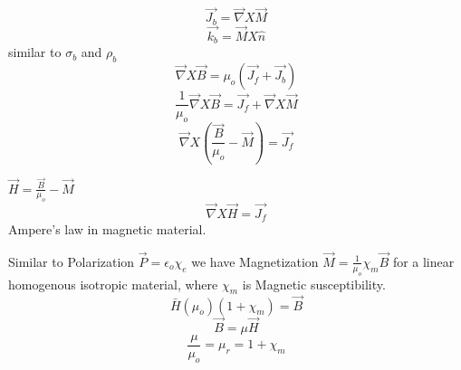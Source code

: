 \[
    \vec{J_{b}} = \vec{\nabla}X\vec{M}
\]
\[
    \vec{k_{b}} = \vec{M} X \hat{n}
\]
similar to \(\sigma_{b}\) and \(\rho_{b}\) 
\[
    \vec{\nabla}X\vec{B} = \mu_{o} (\vec{J_{f}}+\vec{J_{b}})
\]
\[
    \frac{1}{\mu_{o}} \vec{\nabla}X\vec{B} = \vec{J_{f} }+\vec{\nabla}X\vec{M}
\]
\[
    \vec{\nabla}X(\frac{\vec{B}}{\mu_{o} }-\vec{M}) = \vec{J_{f}}
\]
\begin{definition}
    \(\vec{H} = \frac{\vec{B}}{\mu_{o} }-\vec{M}\)
    \[
        \vec{\nabla} X \vec{H} = \vec{J_{f} }
    \]Ampere's law in magnetic material.
\end{definition}
\vspace{.3cm}
Similar to Polarization \(\vec{P} = \epsilon_{o} \chi_{e} \) we have  Magnetization \(\vec{M} = \frac{1}{\mu_{o} }\chi_{m}\vec{B}\) for a linear homogenous isotropic material, where \(\chi_{m} \) is Magnetic susceptibility. 
\[
    \bar{H}(\mu_{o} )(1+\chi_{m} ) = \vec{B}
\]
\[
    \vec{B} = \mu \vec{H}
\]
\[
    \frac{\mu}{\mu_{o} } = \mu_{r} = 1+\chi_{m} 
\]